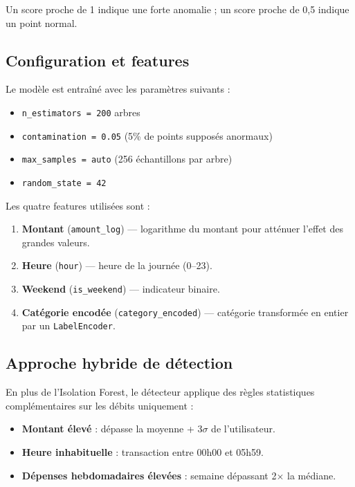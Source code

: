 \documentclass[12pt,a4paper]{report}
\begin{document}
Un score proche de 1 indique une forte anomalie ; un score proche de 0,5
indique un point normal.

\subsection{Configuration et features}

Le modèle est entraîné avec les paramètres suivants :
\begin{itemize}[noitemsep]
  \item \texttt{n\_estimators = 200} arbres
  \item \texttt{contamination = 0.05} (5\% de points supposés anormaux)
  \item \texttt{max\_samples = auto} (256 échantillons par arbre)
  \item \texttt{random\_state = 42}
\end{itemize}

Les quatre features utilisées sont :
\begin{enumerate}[noitemsep]
  \item \textbf{Montant} (\texttt{amount\_log}) — logarithme du montant pour
    atténuer l'effet des grandes valeurs.
  \item \textbf{Heure} (\texttt{hour}) — heure de la journée (0--23).
  \item \textbf{Weekend} (\texttt{is\_weekend}) — indicateur binaire.
  \item \textbf{Catégorie encodée} (\texttt{category\_encoded}) — catégorie
    transformée en entier par un \texttt{LabelEncoder}.
\end{enumerate}

\subsection{Approche hybride de détection}

En plus de l'Isolation Forest, le détecteur applique des règles statistiques
complémentaires sur les débits uniquement :
\begin{itemize}[noitemsep]
  \item \textbf{Montant élevé} : dépasse la moyenne + 3$\sigma$ de l'utilisateur.
  \item \textbf{Heure inhabituelle} : transaction entre 00h00 et 05h59.
  \item \textbf{Dépenses hebdomadaires élevées} : semaine dépassant 2$\times$ la médiane.
\end{itemize}
\end{document}

